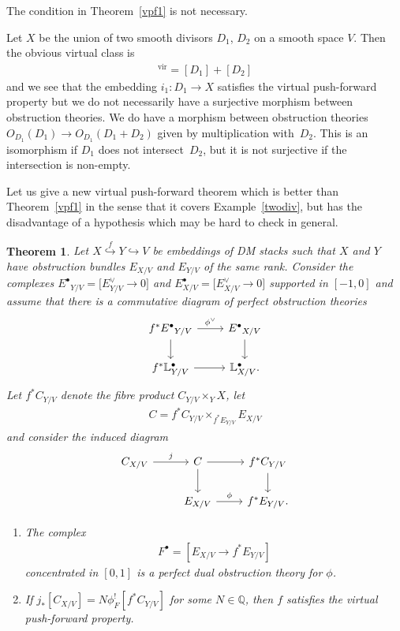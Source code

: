 \documentclass[pdftex]{sigma}
\numberwithin{equation}{section}
\newtheorem{Theorem}{Theorem}[section]
\newcommand{\vv}{\mathrm{vir}}
\theoremstyle{plain}
\theoremstyle{definition}
\theoremstyle{remark}
\begin{document}
The condition in Theorem~\ref{vpf1} is not necessary.
\begin{Example}\label{twodiv} Let $X$ be the union of two smooth divisors $D_1$, $D_2$ on a smooth space $V$. Then the obvious virtual class is \begin{gather*}[X]^{\vv}=[D_1]+[D_2]\end{gather*} and we see that the embedding $i_1\colon D_1\to X$ satisfies the virtual push-forward property but we do not necessarily have a surjective morphism between obstruction theories. We do have a morphism between obstruction theories $O_{D_1}(D_1)\to O_{D_1}(D_1+D_2)$ given by multiplication with~$D_2$. This is an isomorphism if $D_1$ does not intersect~$D_2$, but it is not surjective if the intersection is non-empty.
\end{Example}

Let us give a new virtual push-forward theorem which is better than Theorem~\ref{vpf1} in the sense that it covers Example~\ref{twodiv}, but has the disadvantage of a hypothesis which may be hard to check in general.
\begin{Theorem}\label{vpfnew}
 Let $X\stackrel{f}{\hookrightarrow} Y\hookrightarrow V$ be embeddings of DM stacks such that $X$ and $Y$ have obstruction bundles $E_{X/V}$ and $E_{Y/V}$ of the same rank. Consider the complexes ${E^\bullet}_{Y/V}=\big[E^\vee_{Y/V}\to 0\big]$ and $E^{\bullet}_{X/V}=\big[E^\vee_{X/V}\to 0\big]$ supported in $[-1,0]$ and assume that there is a commutative diagram of perfect obstruction theories
 \begin{equation*}
 \begin{tikzcd}
 f^*{E^{\bullet}}_{Y/V}\ar[r,"{\phi^\vee}"]\ar[d] & {E^{\bullet}}_{X/V} \ar[d] \\
 f^*\mathbb L^\bullet_{Y/V}\ar[r] & \mathbb L^\bullet_{X/V} .
 \end{tikzcd}
 \end{equation*}
Let $f^*C_{Y/V}$ denote the fibre product $C_{Y/V}\times_YX$, let \begin{gather*}C=f^*C_{Y/V}\times_{f^*E_{Y/V}}E_{X/V}\end{gather*} and consider the induced diagram
\[
\begin{tikzcd}
C_{X/V}\ar[r,"j"] & C\ar[r]\ar[d] & f^*C_{Y/V}\ar[d] \\
 & E_{X/V}\ar[r,"\phi"] & f^*E_{Y/V}.
 \end{tikzcd}\]
\begin{enumerate}\itemsep=0pt
\item[$1.$] The complex \begin{gather*}F^\bullet=[E_{X/V}\to f^*E_{Y/V}]\end{gather*} concentrated in $[0,1]$ is a perfect dual obstruction theory for $\phi$.
\item[$2.$] If $j_*[C_{X/V}]=N\phi_F^![f^*C_{Y/V}]$ for some $N\in\mathbb Q$, then $f$ satisfies the virtual push-forward property.
\end{enumerate}
\end{Theorem}
\end{document}

